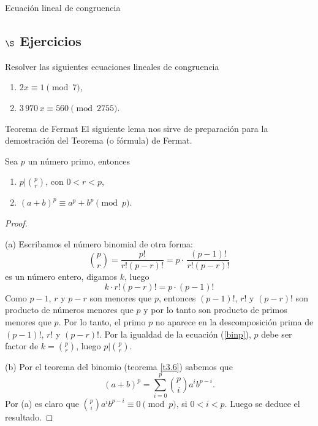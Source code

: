 \begin{section}{Ecuación lineal de congruencia}
\subsection*{\Large $\S$ Ejercicios}
Resolver las siguientes ecuaciones lineales de congruencia
\begin{enumerate}
\item $2x \equiv 1 \pmod{7}$,

\item $3\,970\, x \equiv 560 \pmod{2755}$.
\end{enumerate}

\end{section}



\begin{section}{Teorema de Fermat} 
El siguiente lema nos sirve de preparación para la demostración
del Teorema (o fórmula) de Fermat.

\begin{lema} \label{l4.3} Sea $p$ un número primo, entonces
\begin{enumerate}[label=(\alph*)]
\item  $p|\binom{p}{r}$, con $0< r <p$,
\item  $(a+b)^p \equiv a^p+b^p \pmod{p}$.
\end{enumerate}
\end{lema}
\begin{proof}
	\
	
\noindent({a})  Escribamos el número binomial de otra forma: 
$$
\binom{p}{r}=\frac{p!}{r!(p-r)!}=p\cdot\,\frac{(p-1)!}{r!(p-r)!}
$$ 
es un número entero, digamos $k$, luego 
\begin{equation}\label{binp}
k \cdot r!(p-r)! = p \cdot(p-1)!
\end{equation}
Como $p-1$, $r$ y $p-r$ son menores que $p$, entonces  $(p-1)!$, $r!$ y $(p-r)!$ son producto de números menores que $p$ y por lo tanto son producto de primos menores que $p$. 
Por lo tanto, el primo $p$ no aparece en la descomposición prima de $(p-1)!$, $r!$ y $(p-r)!$. Por la igualdad de la ecuación (\ref{binp}), $p$ debe ser factor de $k = \binom{p}{r}$, luego $p|\binom{p}{r}$.

\noindent({b}) Por el teorema del binomio (teorema \ref{t3.6}) sabemos que
$$
(a+b)^p =\sum_{i=0}^{p} \binom{p}{i} a^ib^{p-i}.
$$
Por ({a}) es claro que $ \binom{p}{i} a^ib^{p-i}\equiv 0 \pmod{p}$,
si $0<i<p$. Luego se deduce el resultado.
\end{proof}


\end{section}
